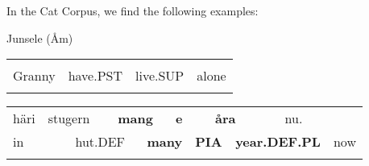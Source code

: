 \begin{styleBodyTextFirst}
In the Cat Corpus, we find the following examples:

\end{styleBodyTextFirst}


\begin{listWWNumileveli}
\item 

\begin{styleExample}
Junsele (Åm)

\end{styleExample}

\end{listWWNumileveli}

\begin{listWWNumxxxixleveli}
\item 

\end{listWWNumxxxixleveli}

\begin{tabular}{llll}
\lsptoprule
\multicolumn{4}{l}{Momma

}\\
Granny & have.PST & live.SUP & alone\\
\lspbottomrule
\end{tabular}

\begin{tabular}{llllllllllll}
\lsptoprule
häri & \multicolumn{2}{l}{stugern

} & \multicolumn{2}{l}{{\bfseries mang}

} & \multicolumn{2}{l}{{\bfseries e}

} & \multicolumn{2}{l}{{\bfseries åra}

} & \multicolumn{2}{l}{nu.

} & \\
\multicolumn{2}{l}{in

} & \multicolumn{2}{l}{hut.DEF

} & \multicolumn{2}{l}{{\bfseries many}

} & \multicolumn{2}{l}{{\bfseries PIA}

} & \multicolumn{2}{l}{{\bfseries year.DEF.PL}

} & \multicolumn{2}{l}{now

}\\
\lspbottomrule
\end{tabular}

